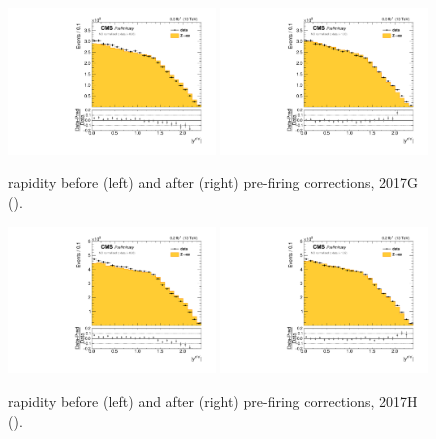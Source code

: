 \begin{figure}[htb]
\centering
\includegraphics[width=0.49\textwidth]{plots/Prefire/Zee5_Zrap_noPrefire.pdf}
\includegraphics[width=0.49\textwidth]{plots/Prefire/Zee5_Zrap_inclPrefire.pdf}
\caption{\zee rapidity before (left) and after (right) pre-firing corrections, 2017G (\serag).}
\label{fig:prefire:zrap:2017G}
\end{figure}

\begin{figure}[htb]
\includegraphics[width=0.49\textwidth]{plots/Prefire/Zee13_Zrap_noPrefire.pdf}
\includegraphics[width=0.49\textwidth]{plots/Prefire/Zee13_Zrap_inclPrefire.pdf}
\caption{\zee rapidity before (left) and after (right) pre-firing corrections, 2017H (\serah).}
\label{fig:prefire:zrap:2017H}
\end{figure}